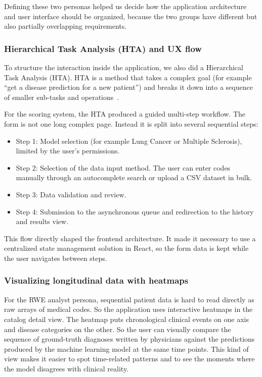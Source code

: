 Defining these two personas helped us decide how the application architecture and user interface should be organized, because the two groups have different but also partially overlapping requirements.

\subsubsection{Hierarchical Task Analysis (HTA) and UX flow}
To structure the interaction inside the application, we also did a Hierarchical Task Analysis (HTA). HTA is a method that takes a complex goal (for example ``get a disease prediction for a new patient'') and breaks it down into a sequence of smaller sub-tasks and operations~\cite{personas_healthcare_2022}.

For the scoring system, the HTA produced a guided multi-step workflow. The form is not one long complex page. Instead it is split into several sequential steps:
\begin{itemize}
    \item Step 1: Model selection (for example Lung Cancer or Multiple Sclerosis), limited by the user's permissions.
    \item Step 2: Selection of the data input method. The user can enter codes manually through an autocomplete search or upload a CSV dataset in bulk.
    \item Step 3: Data validation and review.
    \item Step 4: Submission to the asynchronous queue and redirection to the history and results view.
\end{itemize}
This flow directly shaped the frontend architecture. It made it necessary to use a centralized state management solution in React, so the form data is kept while the user navigates between steps.

\subsubsection{Visualizing longitudinal data with heatmaps}
For the RWE analyst persona, sequential patient data is hard to read directly as raw arrays of medical codes. So the application uses interactive heatmaps in the catalog detail view. The heatmap puts chronological clinical events on one axis and disease categories on the other. So the user can visually compare the sequence of ground-truth diagnoses written by physicians against the predictions produced by the machine learning model at the same time points. This kind of view makes it easier to spot time-related patterns and to see the moments where the model disagrees with clinical reality.

